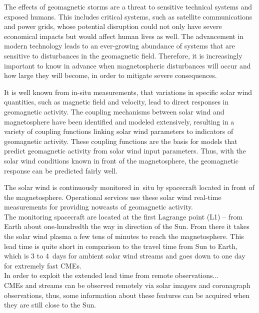The effects of geomagnetic storms are a threat to sensitive technical systems and exposed humans. This includes critical systems, such as satellite communications and power grids, whose potential disruption could not only have severe economical impacts but would affect human lives as well. The advancement in modern technology leads to an ever-growing abundance of systems that are sensitive to disturbances in the geomagnetic field. Therefore, it is increasingly important to know in advance when magnetospheric disturbances will occur and how large they will become, in order to mitigate severe consequences.

It is well known from in-situ measurements, that variations in specific solar wind quantities, such as magnetic field and velocity, lead to direct responses in geomagnetic activity. The coupling mechanisms between solar wind and magnetosphere have been identified and modeled extensively, resulting in a variety of coupling functions linking solar wind parameters to indicators of geomagnetic activity. These coupling functions are the basis for models that predict geomagnetic activity from solar wind input parameters. Thus, with the solar wind conditions known in front of the magnetosphere, the geomagnetic response can be predicted fairly well.

The solar wind is continuously monitored in~situ by spacecraft located in front of the magnetosphere. Operational services use these solar wind real-time measurements for providing nowcasts of geomagnetic activity.\\

The monitoring spacecraft are located at the first Lagrange point (L1) -- from Earth about one-hundredth the way in direction of the Sun.
From there it takes the solar wind plasma a few tens of minutes to reach the magnetosphere. This lead time is quite short in comparison to the travel time from Sun to Earth, which is 3 to 4~days for ambient solar wind streams and goes down to one day for extremely fast CMEs.\\




In order to exploit the extended lead time from remote observations...\\


CMEs and streams can be observed remotely via solar imagers and coronagraph observations, thus, some information about these features can be acquired when they are still close to the Sun.\\


